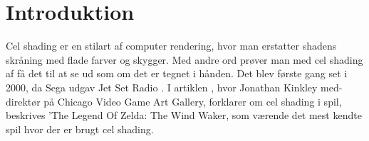 \newpage
\section{Introduktion}
\setcounter{page}{1}
Cel shading er en stilart af computer rendering, hvor man erstatter shadens skråning med flade farver og skygger. Med andre ord prøver man med cel shading af få det til at se ud som om det er tegnet i hånden. Det blev første gang set i 2000, da Sega udgav Jet Set Radio \cite{tvtropes2016}.
I artiklen \cite{Kinkley2016}, hvor Jonathan Kinkley med-direktør på Chicago Video Game Art Gallery, forklarer om cel shading i spil, beskrives ’The Legend Of Zelda: The Wind Waker, som værende det mest kendte spil hvor der er brugt cel shading. 
